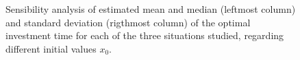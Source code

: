 \begin{figure}[!htb]
\begin{subfigmatrix}{6}
	\end{subfigmatrix}
	\caption{Sensibility analysis of estimated mean and median (leftmost column) and standard deviation (rigthmost column) of the optimal investment time for each of the three situations studied, regarding different initial values $x_0$.}
	\label{fig:stoptime_1}
\end{figure}
\pagebreak



